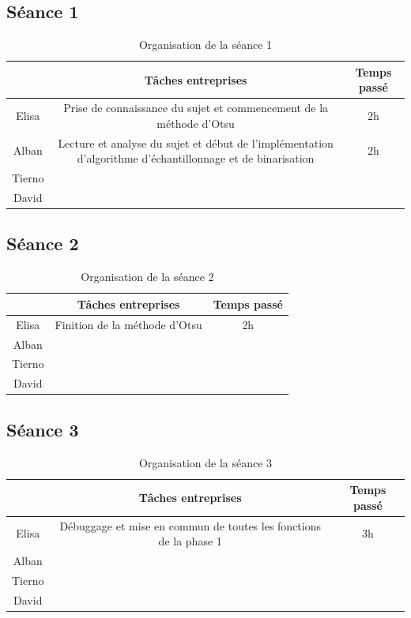 \documentclass{rapport}
\begin{document}
\subsection{Séance 1}

\begin{table}[htbp]
	\centering 
	\begin{tabular}{c|c|c}
		& Tâches entreprises& Temps passé\\ \hline
		Elisa& Prise de connaissance du sujet et commencement de la méthode d'Otsu& 2h\\ \hline
		Alban& Lecture et analyse du sujet et début de l'implémentation d'algorithme d'échantillonnage et de binarisation& 2h\\ \hline
		Tierno& & \\ \hline
		David& & 
	\end{tabular}
	\caption{Organisation de la séance 1}
\end{table}

\subsection{Séance 2}

\begin{table}[htbp]
	\centering 
	\begin{tabular}{c|c|c}
		& Tâches entreprises& Temps passé\\ \hline
		Elisa& Finition de la méthode d'Otsu & 2h\\ \hline
		Alban& & \\ \hline
		Tierno& & \\ \hline
		David& & 
	\end{tabular}
	\caption{Organisation de la séance 2}
\end{table}

\subsection{Séance 3}

\begin{table}[htbp]
	\centering 
	\begin{tabular}{c|c|c}
		& Tâches entreprises& Temps passé\\ \hline
		Elisa& Débuggage et mise en commun de toutes les fonctions de la phase 1 & 3h\\ \hline
		Alban& & \\ \hline
		Tierno& & \\ \hline
		David& & 
	\end{tabular}
	\caption{Organisation de la séance 3}
\end{table}
\end{document}
